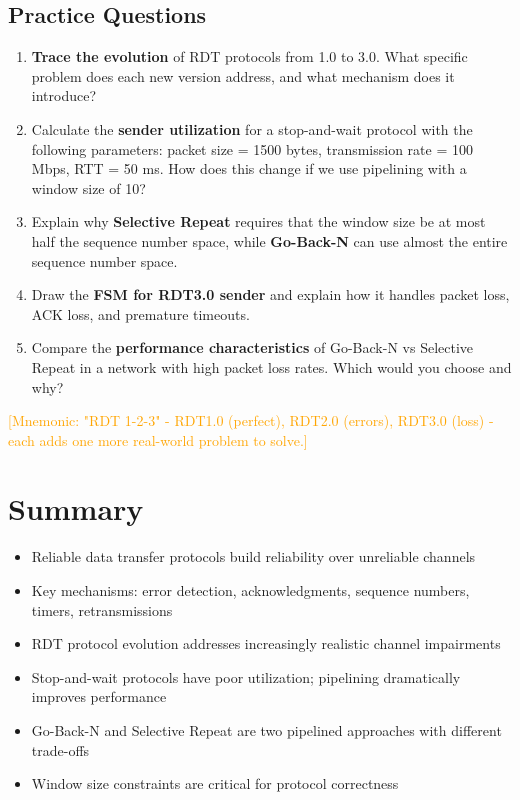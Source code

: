 \documentclass[12pt]{article}
\begin{document}
\subsection{Practice Questions}
\begin{enumerate}
    \item \textbf{Trace the evolution} of RDT protocols from 1.0 to 3.0. What specific problem does each new version address, and what mechanism does it introduce?

    \item Calculate the \textbf{sender utilization} for a stop-and-wait protocol with the following parameters: packet size = 1500 bytes, transmission rate = 100 Mbps, RTT = 50 ms. How does this change if we use pipelining with a window size of 10?

    \item Explain why \textbf{Selective Repeat} requires that the window size be at most half the sequence number space, while \textbf{Go-Back-N} can use almost the entire sequence number space.

    \item Draw the \textbf{FSM for RDT3.0 sender} and explain how it handles packet loss, ACK loss, and premature timeouts.

    \item Compare the \textbf{performance characteristics} of Go-Back-N vs Selective Repeat in a network with high packet loss rates. Which would you choose and why?
\end{enumerate}

\textcolor{orange}{[Mnemonic: "RDT 1-2-3" - RDT1.0 (perfect), RDT2.0 (errors), RDT3.0 (loss) - each adds one more real-world problem to solve.]}

\section{Summary}

\begin{itemize}
    \item Reliable data transfer protocols build reliability over unreliable channels
    \item Key mechanisms: error detection, acknowledgments, sequence numbers, timers, retransmissions
    \item RDT protocol evolution addresses increasingly realistic channel impairments
    \item Stop-and-wait protocols have poor utilization; pipelining dramatically improves performance
    \item Go-Back-N and Selective Repeat are two pipelined approaches with different trade-offs
    \item Window size constraints are critical for protocol correctness
\end{itemize}
\end{document}
